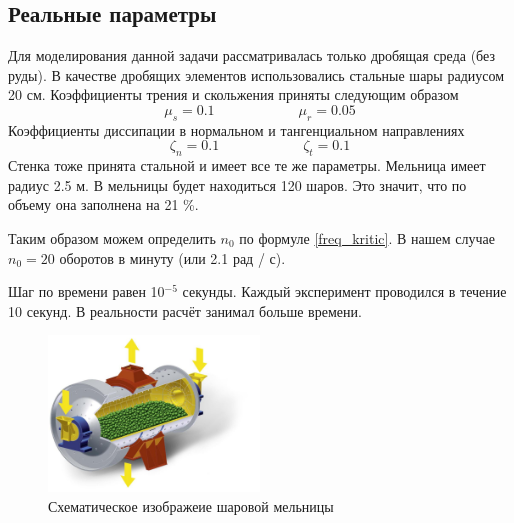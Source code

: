 \documentclass[utf8x, 14pt, oneside, a4paper]{article}
\begin{document}
\subsection{Реальные параметры}

Для моделирования данной задачи рассматривалась только дробящая среда (без руды). 
В качестве дробящих элементов использовались стальные шары радиусом 20 см.
Коэффициенты трения и скольжения приняты следующим образом
\[
\mu_s = 0.1 \qquad \qquad \qquad \mu_r = 0.05
\]
Коэффициенты диссипации в нормальном и тангенциальном направлениях
\[
\zeta_n = 0.1 \qquad \qquad \qquad \zeta_t = 0.1
\]
Стенка тоже принята стальной и имеет все те же параметры.
Мельница имеет радиус 2.5 м.
В мельницы будет находиться 120 шаров.
Это значит, что по объему она заполнена на 21 \%.

Таким образом можем определить $n_0$ по формуле \ref{freq_kritic}. 
В нашем случае $n_0 = 20$ оборотов в минуту (или 2.1 рад / с).

Шаг по времени равен 10$^{-5}$ секунды.
Каждый эксперимент  проводился в течение 10 секунд.
В реальности расчёт занимал больше времени.


\begin{figure}[H]
	\centering
	\includegraphics[width=0.5\textwidth]{mill_end} 
	\caption{Схематическое изображеие шаровой мельницы}
	\label{pic:mill_end}
\end{figure} 
\end{document}
